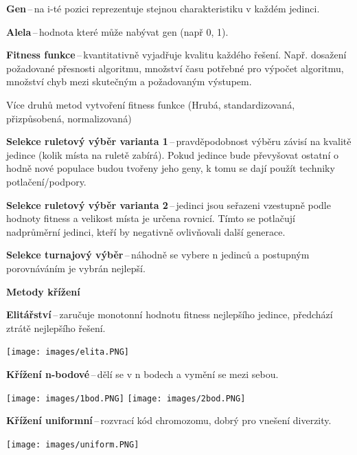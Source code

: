 \textbf{Gen}\,--\,na i-té pozici reprezentuje stejnou charakteristiku v každém jedinci.

\textbf{Alela}\,--\,hodnota které může nabývat gen (např 0, 1).

\textbf{Fitness funkce}\,--\,kvantitativně vyjadřuje kvalitu každého řešení. Např. dosažení požadované přesnosti algoritmu, množství času potřebné pro výpočet algoritmu, množství chyb mezi skutečným a požadovaným výstupem.

Více druhů metod vytvoření fitness funkce (Hrubá, standardizovaná, přizpůsobená, normalizovaná)

\textbf{Selekce ruletový výběr varianta 1}\,--\,pravděpodobnost výběru závisí na kvalitě jedince (kolik místa na ruletě zabírá). Pokud jedince bude převyšovat ostatní o hodně nové populace budou tvořeny jeho geny, k tomu se dají použít techniky potlačení/podpory.

\textbf{Selekce ruletový výběr varianta 2}\,--\,jedinci jsou seřazeni vzestupně podle hodnoty fitness a velikost místa je určena rovnicí. Tímto se potlačují nadprůměrní jedinci, kteří by negativně ovlivňovali další generace.

\textbf{Selekce turnajový výběr}\,--\,náhodně se vybere n jedinců a postupným porovnáváním je vybrán nejlepší.

\begin{Large}\vspace{0,5cm} \textbf{Metody křížení}
\end{Large}

\textbf{Elitářství}\,--\,zaručuje monotonní hodnotu fitness nejlepšího jedince, předchází ztrátě nejlepšího řešení.

\begin{center}
\texttt{[image: images/elita.PNG]}
\end{center}

\textbf{Křížení n-bodové}\,--\,dělí se v n bodech a vymění se mezi sebou.

\begin{center}
\texttt{[image: images/1bod.PNG]}
\texttt{[image: images/2bod.PNG]}

\end{center}

\textbf{Křížení uniformní}\,--\,rozvrací kód chromozomu, dobrý pro vnešení diverzity.

\begin{center}
\texttt{[image: images/uniform.PNG]}
\end{center}

